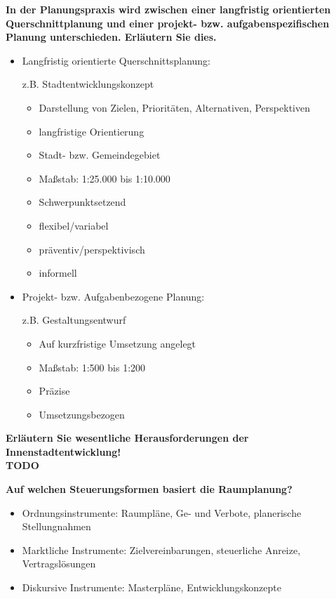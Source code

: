 \documentclass[]{article}
\newenvironment{question}{\vspace{8mm}\noindent\bfseries}{\\}
\begin{document}
\begin{question}
	In der Planungspraxis wird zwischen einer langfristig orientierten Querschnittplanung und einer projekt- bzw. aufgabenspezifischen Planung unterschieden. Erläutern Sie dies.
\end{question}
\begin{itemize}
	\item Langfristig orientierte Querschnittsplanung:
	
	z.B. Stadtentwicklungskonzept
	
	\begin{itemize}
		\item Darstellung von Zielen, Prioritäten, Alternativen, Perspektiven
		\item langfristige Orientierung
		\item Stadt- bzw. Gemeindegebiet
		\item Maßstab: 1:25.000 bis 1:10.000
		\item Schwerpunktsetzend
		\item flexibel/variabel
		\item präventiv/perspektivisch
		\item informell
	\end{itemize}

	\item Projekt- bzw. Aufgabenbezogene Planung:
	
	z.B. Gestaltungsentwurf
	
	\begin{itemize}
		\item Auf kurzfristige Umsetzung angelegt
		\item Maßstab: 1:500 bis 1:200
		\item Präzise
		\item Umsetzungsbezogen
	\end{itemize}
\end{itemize}


\begin{question}
	Erläutern Sie wesentliche Herausforderungen der Innenstadtentwicklung!
\end{question}
TODO


\begin{question}
	Auf welchen Steuerungsformen basiert die Raumplanung?
\end{question}
\begin{itemize}
	\item Ordnungsinstrumente: Raumpläne, Ge- und Verbote, planerische Stellungnahmen
	\item Marktliche Instrumente: Zielvereinbarungen, steuerliche Anreize, Vertragslösungen
	\item Diskursive Instrumente: Masterpläne, Entwicklungskonzepte
\end{itemize}
\end{document}
